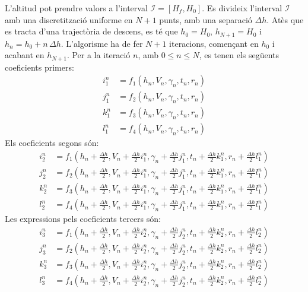 L'altitud pot prendre valors a l'interval $\mathcal{I} = \left[ H_f, H_0 \right]$. Es divideix l'interval $\mathcal{I}$ amb una discretització uniforme en $N+1$ punts, amb una separació $\Delta h$. Atès que es tracta d'una trajectòria de descens, es té que $h_0 = H_0$, $h_{N+1} = H_0$ i  $h_n = h_0 + n \, \Delta h$. L'algorisme ha de fer $N+1$ iteracions, començant en $h_0$ i acabant en $h_{N+1}$. Per a la iteració $n$, amb $0 \leq n \leq N$, es tenen els següents coeficients primers:
\begin{align}
    i_1^n &= f_1 \left( h_n, V_n, \gamma_n, t_n, r_n \right) \\
    j_1^n &= f_2 \left( h_n, V_n, \gamma_n, t_n, r_n \right) \\
    k_1^n &= f_3 \left( h_n, V_n, \gamma_n, t_n, r_n \right) \\
    l_1^n &= f_4 \left( h_n, V_n, \gamma_n, t_n, r_n \right) 
\end{align}
Els coeficients segons són:
\begin{align}
    i_2^n &= f_1 \left( h_n + \frac{\Delta h}{2}, V_n + \frac{\Delta h}{2} i_1^n, 
    \gamma_n + \frac{\Delta h}{2} j_1^n, t_n + \frac{\Delta h}{2} k_1^n, r_n + \frac{\Delta h}{2} l_1^n \right) \\
    j_2^n &= f_2 \left( h_n + \frac{\Delta h}{2}, V_n + \frac{\Delta h}{2} i_1^n, 
    \gamma_n + \frac{\Delta h}{2} j_1^n, t_n + \frac{\Delta h}{2} k_1^n, r_n + \frac{\Delta h}{2} l_1^n \right) \\
    k_2^n &= f_3 \left( h_n + \frac{\Delta h}{2}, V_n + \frac{\Delta h}{2} i_1^n, 
    \gamma_n + \frac{\Delta h}{2} j_1^n, t_n + \frac{\Delta h}{2} k_1^n, r_n + \frac{\Delta h}{2} l_1^n \right) \\
    l_2^n &= f_4 \left( h_n + \frac{\Delta h}{2}, V_n + \frac{\Delta h}{2} i_1^n, 
    \gamma_n + \frac{\Delta h}{2} j_1^n, t_n + \frac{\Delta h}{2} k_1^n, r_n + \frac{\Delta h}{2} l_1^n \right)
\end{align}
Les expressions pels coeficients tercers són:
\begin{align}
    i_3^n &= f_1 \left( h_n + \frac{\Delta h}{2}, V_n + \frac{\Delta h}{2} i_2^n, 
    \gamma_n + \frac{\Delta h}{2} j_2^n, t_n + \frac{\Delta h}{2} k_2^n, r_n + \frac{\Delta h}{2} l_2^n \right) \\
    j_3^n &= f_2 \left( h_n + \frac{\Delta h}{2}, V_n + \frac{\Delta h}{2} i_2^n, 
    \gamma_n + \frac{\Delta h}{2} j_2^n, t_n + \frac{\Delta h}{2} k_2^n, r_n + \frac{\Delta h}{2} l_2^n \right) \\
    k_3^n &= f_3 \left( h_n + \frac{\Delta h}{2}, V_n + \frac{\Delta h}{2} i_2^n, 
    \gamma_n + \frac{\Delta h}{2} j_2^n, t_n + \frac{\Delta h}{2} k_2^n, r_n + \frac{\Delta h}{2} l_2^n \right) \\
    l_3^n &= f_4 \left( h_n + \frac{\Delta h}{2}, V_n + \frac{\Delta h}{2} i_2^n, 
    \gamma_n + \frac{\Delta h}{2} j_2^n, t_n + \frac{\Delta h}{2} k_2^n, r_n + \frac{\Delta h}{2} l_2^n \right)
\end{align}
